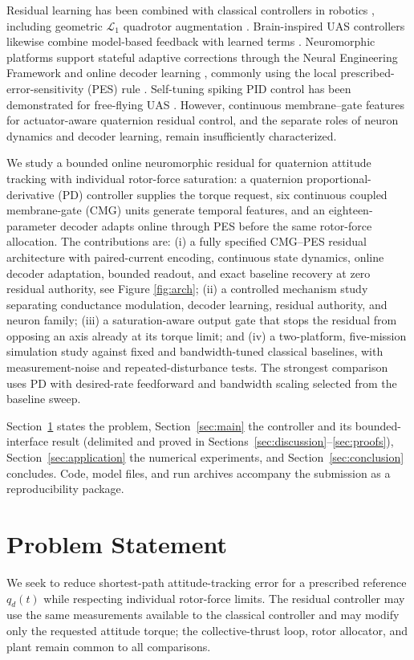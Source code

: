\documentclass[letterpaper, 10 pt, conference]{ieeeconf}
\begin{document}
Residual learning has been combined with classical controllers in robotics \cite{johannink2019}, including geometric $\mathcal L_1$ quadrotor augmentation \cite{wu2025l1quad}. Brain-inspired UAS controllers likewise combine model-based feedback with learned terms \cite{rubioscola2023limbic,rubioscola2021mambo}. Neuromorphic platforms support stateful adaptive corrections through the Neural Engineering Framework and online decoder learning \cite{eliasmith2004neuraleng,bekolay2014nengo}, commonly using the local prescribed-error-sensitivity (PES) rule \cite{voelker2015pes}. Self-tuning spiking PID control has been demonstrated for free-flying UAS \cite{olivares2026selftuning}. However, continuous membrane--gate features for actuator-aware quaternion residual control, and the separate roles of neuron dynamics and decoder learning, remain insufficiently characterized.

We study a bounded online neuromorphic residual for quaternion attitude tracking with individual rotor-force saturation: a quaternion proportional-derivative (PD) controller supplies the torque request, six continuous coupled membrane-gate (CMG) units generate temporal features, and an eighteen-parameter decoder adapts online through PES before the same rotor-force allocation. The contributions are: (i) a fully specified CMG--PES residual architecture with paired-current encoding, continuous state dynamics, online decoder adaptation, bounded readout, and exact baseline recovery at zero residual authority, see Figure \ref{fig:arch}; (ii) a controlled mechanism study separating conductance modulation, decoder learning, residual authority, and neuron family; (iii) a saturation-aware output gate that stops the residual from opposing an axis already at its torque limit; and (iv) a two-platform, five-mission simulation study against fixed and bandwidth-tuned classical baselines, with measurement-noise and repeated-disturbance tests. The strongest comparison uses PD with desired-rate feedforward and bandwidth scaling selected from the baseline sweep.

Section~\ref{sec:problem} states the problem, Section~\ref{sec:main} the controller and its bounded-interface result (delimited and proved in Sections~\ref{sec:discussion}--\ref{sec:proofs}), Section~\ref{sec:application} the numerical experiments, and Section~\ref{sec:conclusion} concludes. Code, model files, and run archives accompany the submission as a reproducibility package.

\section{Problem Statement}
\label{sec:problem}
We seek to reduce shortest-path attitude-tracking error for a prescribed reference $q_d(t)$ while respecting individual rotor-force limits. The residual controller may use the same measurements available to the classical controller and may modify only the requested attitude torque; the collective-thrust loop, rotor allocator, and plant remain common to all comparisons.
\end{document}
